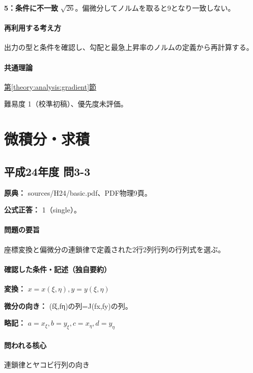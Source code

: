 \noindent\textbf{5：条件に不一致} \(\sqrt{26}\)。偏微分してノルムを取ると9となり一致しない。\par

\paragraph{再利用する考え方} 出力の型と条件を確認し、勾配と最急上昇率のノルムの定義から再計算する。

\paragraph{共通理論} \hyperref[theory:analysis:gradient]{第\ref*{theory:analysis:gradient}節}

\par 難易度 1（校準初稿）、優先度未評価。

\section{微積分・求積}

\subsection{平成24年度 問3-3}
\label{q:h24-reg-basic-3-3}

\noindent\textbf{原典：} sources/H24/basic.pdf、PDF物理9頁。

\textbf{公式正答：} 1（single）。

\paragraph{問題の要旨} 座標変換と偏微分の連鎖律で定義された2行2列行列の行列式を選ぶ。

\paragraph{確認した条件・記述（独自要約）}\mbox{}\par

\noindent\textbf{変換：} \(x=x(\xi,\eta),y=y(\xi,\eta)\)\par

\noindent\textbf{微分の向き：} (fξ,fη)の列=J(fx,fy)の列。\par

\noindent\textbf{略記：} \(a=x_\xi,b=y_\xi,c=x_\eta,d=y_\eta\)\par

\paragraph{問われる核心} 連鎖律とヤコビ行列の向き

